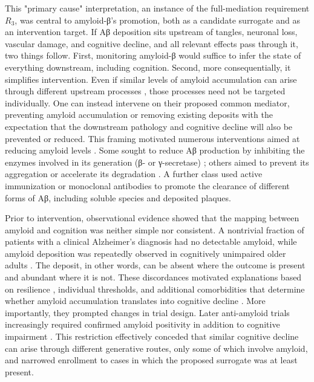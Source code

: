 \documentclass[twocolumn]{article} %
\begin{document}
This "primary cause" interpretation, an instance of the full-mediation requirement $R_3$, was central to amyloid-β's promotion, both as a candidate surrogate and as an intervention target. If Aβ deposition sits upstream of tangles, neuronal loss, vascular damage, and cognitive decline, and all relevant effects pass through it, two things follow. First, monitoring amyloid-β would suffice to infer the state of everything downstream, including cognition. Second, more consequentially, it simplifies intervention. Even if similar levels of amyloid accumulation can arise through different upstream processes \citep[b]{hardy2002amyloid}, those processes need not be targeted individually. One can instead intervene on their proposed common mediator, preventing amyloid accumulation or removing existing deposits with the expectation that the downstream pathology and cognitive decline will also be prevented or reduced. This framing motivated numerous interventions aimed at reducing amyloid levels \citep[c]{hardy2002amyloid}. Some sought to reduce Aβ production by inhibiting the enzymes involved in its generation (β- or γ-secretase) \citep[a]{doody2013phase}; others aimed to prevent its aggregation or accelerate its degradation \citep[a]{egan2018randomized}. A further class used active immunization \citep[a]{gilman2005clinical} or monoclonal antibodies to promote the clearance of different forms of Aβ, including soluble species and deposited plaques.

Prior to intervention, observational evidence showed that the mapping between amyloid and cognition was neither simple nor consistent. A nontrivial fraction of patients with a clinical Alzheimer’s diagnosis had no detectable amyloid, while amyloid deposition was repeatedly observed in cognitively unimpaired older adults \citep[a]{gomez2022lesions} \citep[a]{dickson1992identification} \citep[a]{price1999tangles} \cite{herrup2023not}. The deposit, in other words, can be absent where the outcome is present and abundant where it is not. These discordances motivated explanations based on resilience \citep[b]{gomez2022lesions}, individual thresholds, and additional comorbidities that determine whether amyloid accumulation translates into cognitive decline \citep[c]{gomez2022lesions}. More importantly, they prompted changes in trial design. Later anti-amyloid trials increasingly required confirmed amyloid positivity in addition to cognitive impairment \citep[b]{salloway2014two} \citep[d]{gomez2022lesions} \citep[e]{gomez2022lesions}. This restriction effectively conceded that similar cognitive decline can arise through different generative routes, only some of which involve amyloid, and narrowed enrollment to cases in which the proposed surrogate was at least present.
\end{document}
